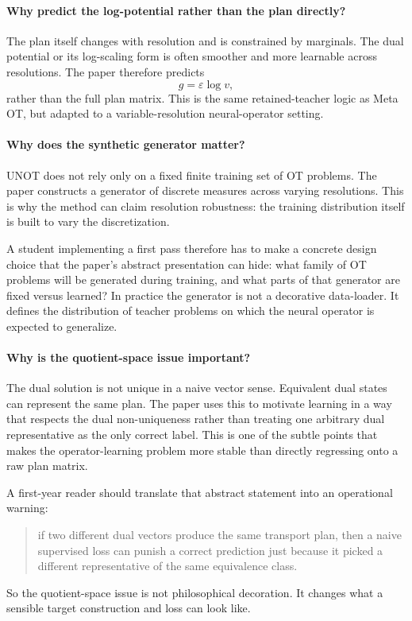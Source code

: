 \documentclass[11pt]{report}
\begin{document}
\paragraph{Why predict the log-potential rather than the plan directly?}
The plan itself changes with resolution and is constrained by marginals.  The dual
potential or its log-scaling form is often smoother and more learnable across
resolutions.  The paper therefore predicts
\begin{equation}
g = \varepsilon \log v,
\label{eq:unot-log-scaling}
\end{equation}
rather than the full plan matrix.  This is the same retained-teacher logic as Meta
OT, but adapted to a variable-resolution neural-operator setting.

\paragraph{Why does the synthetic generator matter?}
UNOT does not rely only on a fixed finite training set of OT problems.  The paper
constructs a generator of discrete measures across varying resolutions.  This is
why the method can claim resolution robustness: the training distribution itself is
built to vary the discretization.

A student implementing a first pass therefore has to make a concrete design choice
that the paper's abstract presentation can hide: what family of OT problems will be
generated during training, and what parts of that generator are fixed versus
learned?  In practice the generator is not a decorative data-loader.  It defines
the distribution of teacher problems on which the neural operator is expected to
generalize.

\paragraph{Why is the quotient-space issue important?}
The dual solution is not unique in a naive vector sense.  Equivalent dual states
can represent the same plan.  The paper uses this to motivate learning in a way
that respects the dual non-uniqueness rather than treating one arbitrary dual
representative as the only correct label.  This is one of the subtle points that
makes the operator-learning problem more stable than directly regressing onto a raw
plan matrix.

A first-year reader should translate that abstract statement into an operational
warning:
\begin{quote}
if two different dual vectors produce the same transport plan, then a naive
supervised loss can punish a correct prediction just because it picked a different
representative of the same equivalence class.
\end{quote}
So the quotient-space issue is not philosophical decoration.  It changes what a
sensible target construction and loss can look like.
\end{document}
